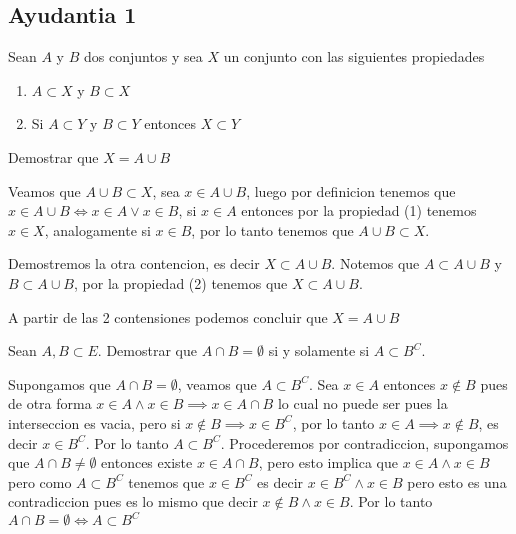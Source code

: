 \documentclass[../main.tex]{subfiles}
\begin{document}
\subsection{Ayudantia 1}

\begin{problem}
  Sean $A$ y $B$ dos conjuntos y sea $X$ un conjunto con las siguientes propiedades
  \begin{enumerate}
    \item $A \subset X$ y $B \subset X$
    \item Si $A \subset Y$ y $B \subset Y$ entonces $X \subset Y$
  \end{enumerate}

  Demostrar que $X = A \cup B$
\end{problem}
\begin{solution}
  Veamos que $A \cup B \subset X$, sea $x \in A \cup B$, luego por definicion tenemos que
  $x \in A \cup B \iff x \in A \lor x \in B$, si $x \in A$ entonces por la propiedad (1) tenemos
  $x \in X$, analogamente si $x \in B$, por lo tanto tenemos que $A \cup B \subset X$.

  Demostremos la otra contencion, es decir $X \subset A \cup B$. Notemos que $A \subset A \cup B$ y $B \subset A \cup B$, por la propiedad (2) tenemos que $X \subset A \cup B$.

  A partir de las 2 contensiones podemos concluir que $X = A \cup B$
\end{solution}

\begin{problem}
Sean $A, B \subset E$. Demostrar que $A \cap B = \emptyset$ si y solamente si $A \subset B^{C}$.
\end{problem}
\begin{solution}
Supongamos que $A \cap B = \emptyset$, veamos que $A \subset B^{C}$. Sea $x \in A$ entonces $x \notin B$ pues de otra forma $x \in A \land x \in B \implies x \in A \cap B$ lo cual no puede ser pues la interseccion es vacia, pero si $x \notin B \implies x \in B^{C}$, por lo tanto $x \in A \implies x \notin B$, es decir $x \in B^{C}$. Por lo tanto $A \subset B^{C}$. Procederemos por contradiccion, supongamos que $A \cap B \neq \emptyset$ entonces existe $x \in A \cap B$, pero esto implica que $x \in A \land x \in B$ pero como $A \subset B^{C}$ tenemos que $x \in B^{C}$ es decir $x \in B^{C} \land x \in B$ pero esto es una contradiccion pues es lo mismo que decir $x \notin B \land x \in B$. Por lo tanto $A \cap B = \emptyset \iff A \subset B^{C}$
\end{solution}
\end{document}
